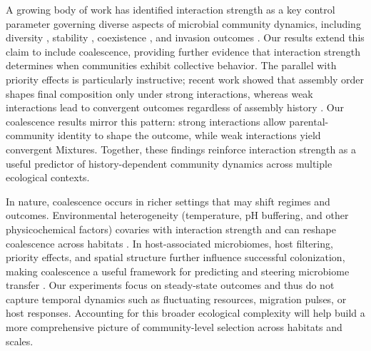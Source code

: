 A growing body of work has identified interaction strength as a key control parameter governing diverse aspects of microbial community dynamics, including diversity \citep{Hu2022, Marsland2019}, stability \citep{Allesina2012, Ratzke2020}, coexistence \citep{Grilli2017}, and invasion outcomes \citep{Hu2025, Kurkjian2021}. Our results extend this claim to include coalescence, providing further evidence that interaction strength determines when communities exhibit collective behavior.  The parallel with priority effects is particularly instructive; recent work showed that assembly order shapes final composition only under strong interactions, whereas weak interactions lead to convergent outcomes regardless of assembly history \citep{Hu2025, Fukami2015}. Our coalescence results mirror this pattern: strong interactions allow parental-community identity to shape the outcome, while weak interactions yield convergent Mixtures. Together, these findings reinforce interaction strength as a useful predictor of history-dependent community dynamics across multiple ecological contexts.


 In nature, coalescence occurs in richer settings that may shift regimes and outcomes. Environmental heterogeneity (temperature, pH buffering, and other physicochemical factors) covaries with interaction strength and can reshape coalescence across habitats \citep{Rillig2015, Castledine2020, Rillig2017, Tropini2017}. In host-associated microbiomes, host filtering, priority effects, and spatial structure further influence successful colonization, making coalescence a useful framework for predicting and steering microbiome transfer \citep{Liu2024, Smillie2018, Rocca2021}. Our experiments focus on steady-state outcomes and thus do not capture temporal dynamics such as fluctuating resources, migration pulses, or host responses. Accounting for this broader ecological complexity will help build a more comprehensive picture of community-level selection across habitats and scales.

